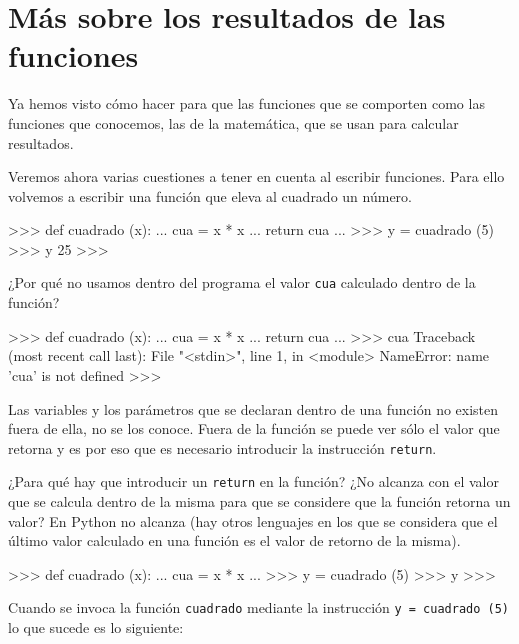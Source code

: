
\section{Más sobre los resultados de las funciones}

Ya hemos visto cómo hacer para que las funciones que se comporten como las
funciones que conocemos, las de la matemática, que
se usan para calcular resultados.

Veremos ahora varias cuestiones a tener en cuenta al escribir
funciones. Para ello volvemos a escribir una función que eleva al cuadrado un número.

\begin{codigo-python-sn}
>>> def cuadrado (x):
...         cua = x * x
...         return cua
...
>>> y = cuadrado (5)
>>> y
25
>>>
\end{codigo-python-sn}

¿Por qué no usamos dentro del programa el valor \verb+cua+ calculado dentro de
la función?

\begin{codigo-python-sn}
>>> def cuadrado (x):
...     cua = x * x
...     return cua
...
>>> cua
Traceback (most recent call last):
  File "<stdin>", line 1, in <module>
NameError: name 'cua' is not defined
>>>
\end{codigo-python-sn}

\begin{observacion}
Las variables y los parámetros que se declaran
dentro de una función no existen fuera de ella, no se los conoce.
Fuera de la función se puede ver sólo el valor que retorna
y es por eso que es necesario introducir la instrucción \lstinline!return!.
\end{observacion}

¿Para qué hay que introducir un \lstinline+return+ en la función?
¿No alcanza con el valor que se calcula dentro de la misma
para que se considere que la función retorna un valor? En
Python no alcanza (hay otros lenguajes en los que se considera que el
último valor calculado en una función es el valor de retorno de la misma).

\begin{codigo-python-sn}
>>> def cuadrado (x):
...     cua = x * x
...
>>> y = cuadrado (5)
>>> y
>>>
\end{codigo-python-sn}

Cuando se invoca la función \lstinline!cuadrado! mediante la instrucción
\verb+y = cuadrado (5)+ lo que sucede es lo siguiente:

